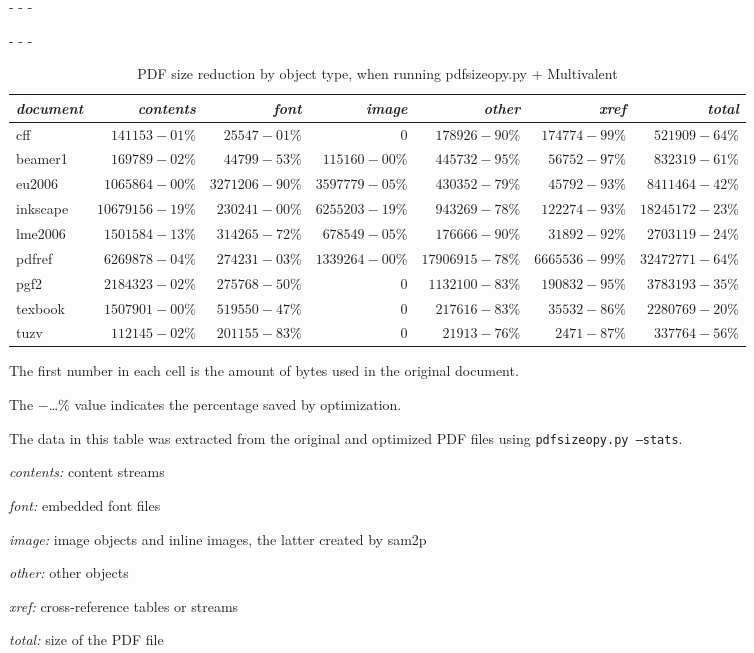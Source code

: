 \documentclass{ltugproc}
\def\cmd{\textsf}
\def\captiontop#1{%
  \advance\abovecaptionskip-\belowcaptionskip
  \advance\belowcaptionskip\abovecaptionskip
  \advance\abovecaptionskip-\belowcaptionskip
  \abovecaptionskip-\abovecaptionskip
  \caption{#1}%
  \advance\abovecaptionskip-\belowcaptionskip
  \advance\belowcaptionskip\abovecaptionskip
  \advance\abovecaptionskip-\belowcaptionskip
  \abovecaptionskip-\abovecaptionskip
}
\begin{document}
\begin{table*}
\captiontop{PDF size reduction by object type, when running
\cmd{pdfsizeopy.py} + Multivalent}\label{tab:psom-by-type}
\advance\tabcolsep-2pt  %
\par\small\noindent\hfil
\begin{tabular*}{\hsize}{@{\extracolsep{\fill}}lrrrrrr@{}}
\toprule
\emph{document} & \emph{contents} & \emph{font} & \emph{image} & \emph{other} & \emph{xref} & \emph{total} \\\midrule
cff & $141153-01$\% & $25547-01$\% & 0 & $178926-90$\% & $174774-99$\% & $521909-64$\% \\              
beamer1 & $169789-02$\% & $44799-53$\% & $115160-00$\% & $445732-95$\% & $56752-97$\% & $832319-61$\% \\                
eu2006 & $1065864-00$\% & $3271206-90$\% & $3597779-05$\% & $430352-79$\% & $45792-93$\% & $8411464-42$\% \\                    
inkscape & $10679156-19$\% & $230241-00$\% & $6255203-19$\% & $943269-78$\% & $122274-93$\% & $18245172-23$\% \\                
lme2006 & $1501584-13$\% & $314265-72$\% & $678549-05$\% & $176666-90$\% & $31892-92$\% & $2703119-24$\% \\              
pdfref & $6269878-04$\% & $274231-03$\% & $1339264-00$\% & $17906915-78$\% & $6665536-99$\% & $32472771-64$\% \\                         
pgf2 & $2184323-02$\% & $275768-50$\% & 0 & $1132100-83$\% & $190832-95$\% & $3783193-35$\% \\              
texbook & $1507901-00$\% & $519550-47$\% & 0 & $217616-83$\% & $35532-86$\% & $2280769-20$\% \\         
tuzv & $112145-02$\% & $201155-83$\% & 0 & $21913-76$\% & $2471-87$\% & $337764-56$\% \\         
\bottomrule
\end{tabular*}
\par\bigskip
\par\noindent The first number in each cell is the amount of bytes used in
the original document.
\par\noindent The $-$\ldots\% value indicates the percentage saved by
optimization.
\par\noindent The data in this table was extracted from the original and
optimized PDF files using \texttt{pdfsizeopy.py --stats}.
\medskip
\par\noindent \emph{contents:} content streams
\par\noindent \emph{font:} embedded font files
\par\noindent \emph{image:} image objects and inline images, the latter
created by \cmd{sam2p}
\par\noindent \emph{other:} other objects
\par\noindent \emph{xref:} cross-reference tables or streams
\par\noindent \emph{total:} size of the PDF file
\end{table*}
\end{document}
